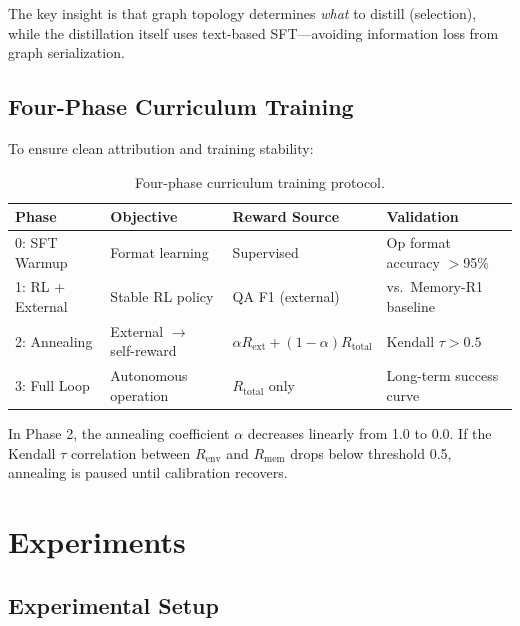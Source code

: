 \documentclass{article}
\newcommand{\renv}{R_{\mathrm{env}}}
\newcommand{\rmem}{R_{\mathrm{mem}}}
\newcommand{\rtotal}{R_{\mathrm{total}}}
\begin{document}
The key insight is that graph topology determines \emph{what} to distill (selection), while the distillation itself uses text-based SFT---avoiding information loss from graph serialization.

\subsection{Four-Phase Curriculum Training}
\label{sec:curriculum}

To ensure clean attribution and training stability:

\begin{table}[h]
\centering
\small
\caption{Four-phase curriculum training protocol.}
\label{tab:phases}
\begin{tabular}{llll}
\toprule
\textbf{Phase} & \textbf{Objective} & \textbf{Reward Source} & \textbf{Validation} \\
\midrule
0: SFT Warmup & Format learning & Supervised & Op format accuracy $>$95\% \\
1: RL + External & Stable RL policy & QA F1 (external) & vs.~Memory-R1 baseline \\
2: Annealing & External $\to$ self-reward & $\alpha R_\text{ext} + (1-\alpha)\rtotal$ & Kendall $\tau > 0.5$ \\
3: Full Loop & Autonomous operation & $\rtotal$ only & Long-term success curve \\
\bottomrule
\end{tabular}
\end{table}

In Phase 2, the annealing coefficient $\alpha$ decreases linearly from 1.0 to 0.0. If the Kendall $\tau$ correlation between $\renv$ and $\rmem$ drops below threshold 0.5, annealing is paused until calibration recovers.


\section{Experiments}
\label{sec:experiments}

\subsection{Experimental Setup}
\end{document}
